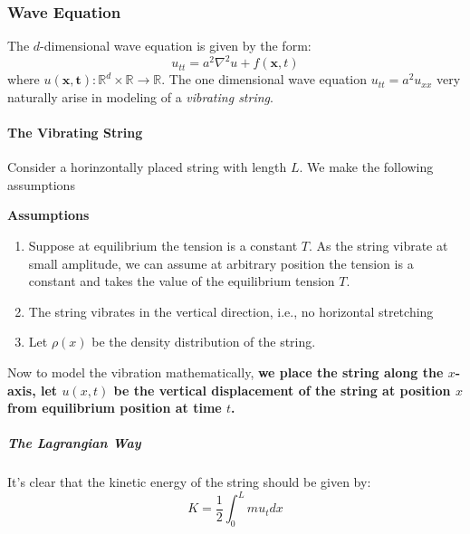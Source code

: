 \subsubsection{Wave Equation}

%
\providecommand{\argmin}{\operatorname*{arg\,min}}%
\providecommand{\argmax}{\operatorname*{arg\,max}}%
The $d$-dimensional wave equation is given by the form:
\begin{equation}
u_{tt} = a^2 \nabla^2 u + f(\mathbf{x},t)
\end{equation}
where $u(\mathbf{x,t}): \mathbb{R}^d\times \mathbb{R}\to \mathbb{R}$.\newline
The one dimensional wave equation $u_{tt}=a^2u_{xx}$ very naturally arise in modeling of a \textit{vibrating string}.

\paragraph{The Vibrating String}

Consider a horinzontally placed string with length $L$. We make the following assumptions

\begin{framed}
\textbf{Assumptions}\\
\begin{enumerate}
\item Suppose at equilibrium the tension is a constant $T$. As the string vibrate at small amplitude, we can assume at arbitrary  position the tension is a constant and takes the value of the equilibrium tension $T$.
\item The string vibrates in the vertical direction, i.e., no horizontal stretching
\item Let $\rho(x)$ be the density distribution of the string.
\end{enumerate}
\end{framed}

Now to model the vibration mathematically, \textbf{we place the string along the $x$-axis, let $u(x,t)$ be the vertical displacement of the string at position $x$ from equilibrium position at time $t$.}

\subparagraph{The Lagrangian Way}

It's clear that the kinetic energy of the string should be given by:
\begin{equation}
K=\frac{1}{2}\int_0^L mu_tdx
\end{equation}